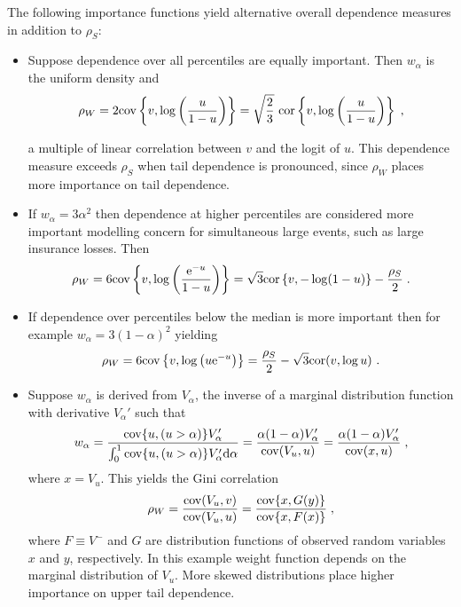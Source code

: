 \documentclass[authoryear]{elsarticle}
\newcommand{\cov}{{\rm cov}}
\newcommand{\cor}{\mathrm{cor}}
\newcommand{\e}{\mathrm{e}}
\newcommand{\de}{\mathrm{d}}
\begin{document}
The following importance functions yield alternative overall dependence measures in addition to  $\rho_S$:
\begin{itemize}

\item Suppose dependence over all percentiles are equally important.   Then $w_\alpha$ is the uniform density and
$$
\rho_W =2\cov\left\{v,\log\left(\frac{u}{1-u}\right)\right\}
= \sqrt{\frac{2}{3}}\ \cor\left\{v,\log\left(\frac{u}{1-u}\right)\right\} \;,
$$

a multiple of linear correlation between $v$ and the logit of $u$. This dependence measure exceeds  $\rho_S$ when tail dependence is pronounced, since $\rho_W$ places more importance on tail dependence.

\item If $w_\alpha=3\alpha^2$  then dependence at higher percentiles are considered more important modelling  concern for simultaneous large events, such as large insurance losses. Then
$$
\rho_W = 6\cov\left\{v,\log\left(\frac{\e^{-u}}{1-u}\right) \right\}
=\sqrt{3} \cor\left\{v,-\log(1-u)\right\}-\frac{\rho_S}{2}\;.
$$

\item If dependence over percentiles below the median is more important then for example  $w_\alpha=3(1-\alpha)^2$ yielding
$$
\rho_W = 6\cov\left\{v,\log \left( u \e^{-u}\right) \right\}
= \frac{\rho_S}{2}  - \sqrt{3}\cor(v,\log u ) \ .
$$


\item Suppose $w_\alpha$ is derived from $V_\alpha$, the inverse of a marginal distribution function with derivative $V_\alpha'$ such that
$$
w_\alpha = \frac{\cov\{u,(u>\alpha)\}V_\alpha'}{\int_0^1 \cov\{u,(u>\alpha)\}V_\alpha' \de\alpha}
=\frac{\alpha(1-\alpha)V_\alpha'}{\cov(V_u,u)}
=\frac{\alpha(1-\alpha)V_\alpha'}{\cov(x,u)} \;,
$$
where $x=V_u$. This yields the Gini correlation  \citep{schechtman1999proper}
$$
\rho_W=\frac{\cov(V_u,v)}{\cov(V_u,u)} = \frac{\cov\{x,G(y)\}}{\cov\{x,F(x)\}} \;,
$$
where $F\equiv V^-$ and $G$ are distribution functions of observed random variables $x$ and $y$, respectively.  In this example
weight function depends on the marginal distribution of $V_u$.   More skewed distributions place higher importance on upper tail dependence.

\end{itemize}
\end{document}
